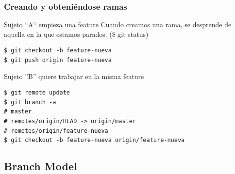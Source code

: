 \documentclass{beamer}
\begin{document}
\begin{frame}[fragile]\frametitle{Creando y obteniéndose ramas}

    \begin{block}{Sujeto ``A`` empieza una feature}
      Cuando creamos una rama, se desprende de aquella en la que estamos parados. (\$ git status)
      \begin{verbatim}
$ git checkout -b feature-nueva
$ git push origin feature-nueva
      \end{verbatim}
    \end{block} \pause
    
    \begin{block}{Sujeto ''B'' quiere trabajar en la misma feature}
      \begin{verbatim}
$ git remote update
$ git branch -a
# master
# remotes/origin/HEAD -> origin/master
# remotes/origin/feature-nueva
$ git checkout -b feature-nueva origin/feature-nueva
      \end{verbatim}
    \end{block}
  
\end{frame}

\subsection{Branch Model}
\end{document}

